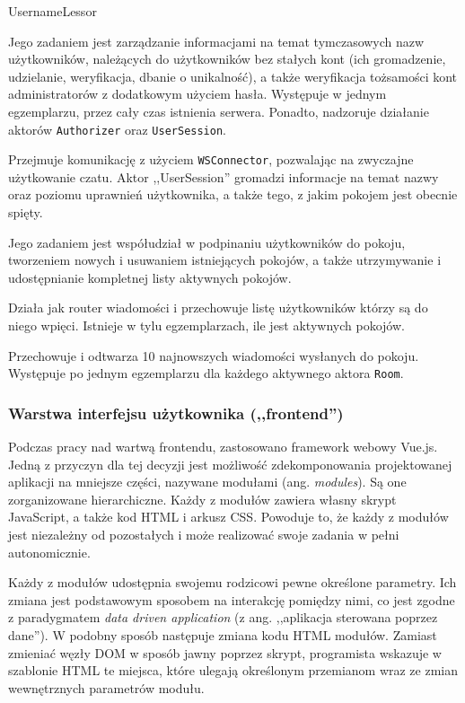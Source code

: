 \begin{labeling}{UsernameLessor}
  \item[\texttt{UsernameLessor}] Jego zadaniem jest zarządzanie informacjami na
  temat tymczasowych nazw użytkowników, należących do	użytkowników bez stałych
  kont (ich gromadzenie, udzielanie, weryfikacja, dbanie o unikalność), a także
  weryfikacja tożsamości kont administratorów z dodatkowym użyciem hasła.
  Występuje w jednym egzemplarzu, przez cały czas istnienia serwera. Ponadto,
  nadzoruje działanie aktorów \texttt{Authorizer} oraz \texttt{UserSession}.

  \item[\texttt{UserSession}] Przejmuje komunikację z użyciem
  \texttt{WSConnector}, pozwalając na zwyczajne użytkowanie czatu. Aktor
  ,,UserSession'' gromadzi informacje na temat nazwy oraz poziomu uprawnień
  użytkownika, a także tego, z jakim pokojem jest obecnie spięty.

  \item[\texttt{Landlord}] Jego zadaniem jest współudział w podpinaniu
  użytkowników do pokoju, tworzeniem nowych i usuwaniem istniejących pokojów, a
  także utrzymywanie i udostępnianie kompletnej listy aktywnych pokojów.

  \item[\texttt{Room}] Działa jak router wiadomości i przechowuje listę użytkowników którzy są do niego wpięci. Istnieje w tylu egzemplarzach, ile jest aktywnych pokojów.

  \item[\texttt{MessageBuffer}] Przechowuje i odtwarza 10 najnowszych wiadomości wysłanych do pokoju. Występuje po jednym egzemplarzu dla każdego aktywnego aktora \texttt{Room}.

\end{labeling}

\newpage

\subsubsection{Warstwa interfejsu użytkownika (,,frontend'')}
Podczas pracy nad wartwą frontendu, zastosowano framework webowy Vue.js. Jedną
z przyczyn dla tej decyzji jest możliwość zdekomponowania projektowanej aplikacji na mniejsze części, nazywane modułami (ang. \textit{modules}). Są one zorganizowane hierarchiczne. Każdy z modułów zawiera własny skrypt JavaScript, a także kod HTML i arkusz CSS. Powoduje to, że każdy z modułów jest niezależny od pozostałych i może realizować swoje zadania w pełni autonomicznie.

Każdy z modułów udostępnia swojemu rodzicowi pewne określone parametry. Ich zmiana
jest podstawowym sposobem na interakcję pomiędzy nimi, co jest zgodne z
paradygmatem \textit{data driven application} (z ang. ,,aplikacja sterowana
poprzez dane''). W podobny sposób następuje zmiana kodu HTML modułów. Zamiast
zmieniać węzły DOM w sposób jawny poprzez skrypt, programista wskazuje w
szablonie HTML te miejsca, które ulegają określonym przemianom wraz ze
zmian wewnętrznych parametrów modułu.

